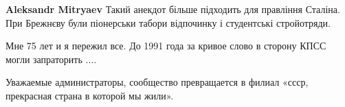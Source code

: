 \begin{itemize}
\begin{itemize}
\textbf{Aleksandr Mitryaev} Такий анекдот більше підходить для правління Сталіна. При Брежнєву були піонерськи табори відпочинку і студентські стройотряди.

Мне 75 лет и я пережил все. До 1991 года за кривое слово в сторону КПСС могли запраторить ....
\end{itemize} %


Уважаемые администраторы, сообщество превращается в филиал «ссср, прекрасная
страна в которой мы жили».

\end{itemize} %
